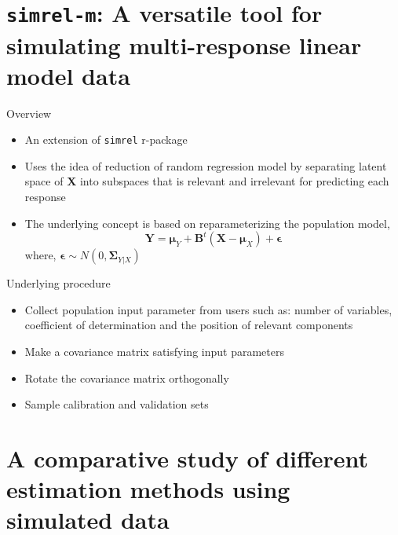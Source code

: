 \documentclass[ignorenonframetext,]{beamer}
\providecommand{\tightlist}{%
  \setlength{\itemsep}{0pt}\setlength{\parskip}{0pt}}
\begin{document}
\section{\texorpdfstring{\texttt{simrel-m}: A versatile tool for
simulating multi-response linear model
data}{simrel-m: A versatile tool for simulating multi-response linear model data}}\label{simrel-m-a-versatile-tool-for-simulating-multi-response-linear-model-data}

\begin{frame}[fragile]{Overview}

\begin{itemize}[<+->]
\tightlist
\item
  An extension of \texttt{simrel} \citep{saebo2015simrel} r-package
\item
  Uses the idea of reduction of random regression model by separating
  latent space of \(\mathbf{X}\) into subspaces that is relevant and
  irrelevant for predicting each response
\item
  The underlying concept is based on reparameterizing the population
  model, \[
  \mathbf{Y} = \boldsymbol{\mu}_{Y} + \mathbf{B}^t\left(\mathbf{X} - \boldsymbol{\mu}_X\right) + \boldsymbol{\epsilon}
  \] where,
  \(\boldsymbol{\epsilon} \sim N(0, \boldsymbol{\Sigma}_{Y|X})\)
\end{itemize}

\end{frame}

\begin{frame}{Underlying procedure}

\hypertarget{left}{}

\hypertarget{right}{}
\begin{itemize}[<+->]
\tightlist
\item
  Collect population input parameter from users such as: number of
  variables, coefficient of determination and the position of relevant
  components
\item
  Make a covariance matrix satisfying input parameters
\item
  Rotate the covariance matrix orthogonally
\item
  Sample calibration and validation sets
\end{itemize}

\end{frame}

\section{A comparative study of different estimation methods using
simulated
data}\label{a-comparative-study-of-different-estimation-methods-using-simulated-data}
\end{document}
